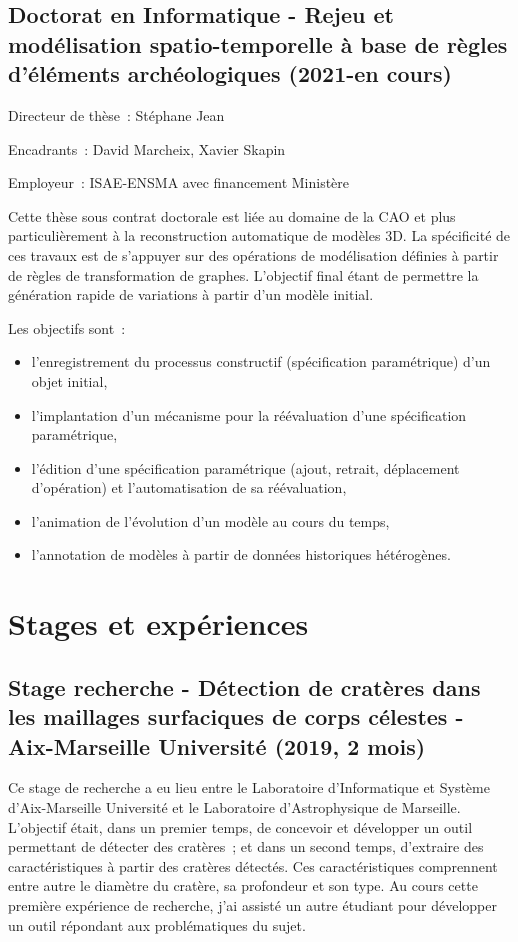 \documentclass[11pt,a4paper,oneside]{article}
\begin{document}
\subsection{Doctorat en Informatique - Rejeu et modélisation spatio-temporelle à base de règles d'éléments archéologiques  (2021-en cours)}

\noindent Directeur de thèse~: Stéphane Jean

\noindent Encadrants~: David Marcheix, Xavier Skapin

\noindent Employeur~: ISAE-ENSMA avec financement Ministère

Cette thèse sous contrat doctorale est liée au domaine de la CAO et plus
particulièrement à la reconstruction automatique de modèles 3D. %
La spécificité de ces travaux est de s'appuyer sur des opérations de
modélisation définies à partir de règles de transformation de graphes. %
L'objectif final étant de permettre la génération rapide de variations à partir
d'un modèle initial. %

Les objectifs sont~:
\begin{itemize}
	\item l'enregistrement du processus constructif (spécification paramétrique)
	      d'un objet initial,
	\item l'implantation d'un mécanisme pour la réévaluation d'une spécification
	      paramétrique,
	\item l'édition d'une spécification paramétrique (ajout, retrait, déplacement
	      d'opération) et l'automatisation de sa réévaluation,
	\item l'animation de l'évolution d'un modèle au cours du temps,
	\item l'annotation de modèles à partir de données historiques hétérogènes.
\end{itemize}

\section{Stages et expériences}

\subsection{Stage recherche - Détection de cratères dans les maillages surfaciques de corps célestes - Aix-Marseille Université (2019, 2 mois)}

Ce stage de recherche a eu lieu entre le Laboratoire d'Informatique et Système
d'Aix-Marseille Université et le Laboratoire d'Astrophysique de Marseille. %
L'objectif était, dans un premier temps, de concevoir et développer un outil
permettant de détecter des cratères~; et dans un second temps, d'extraire des
caractéristiques à partir des cratères détectés. %
Ces caractéristiques comprennent entre autre le diamètre du cratère, sa
profondeur et son type. %
Au cours cette première expérience de recherche, j'ai assisté un autre étudiant
pour développer un outil répondant aux problématiques du sujet. %
\end{document}
